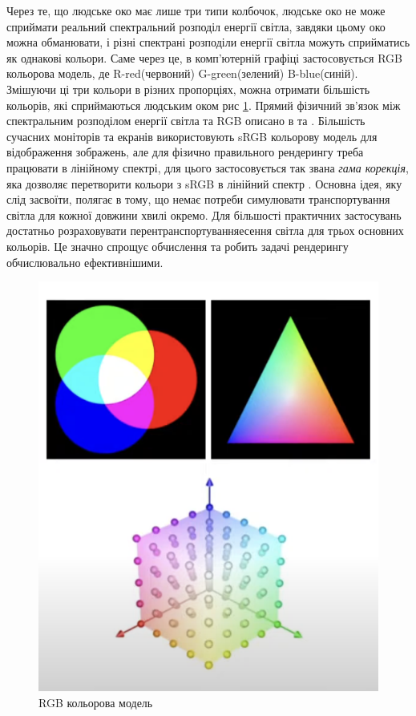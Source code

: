 Через те, що людське око має лише три типи колбочок, людське око не може сприймати реальний спектральний розподіл енергії світла,
завдяки цьому око можна обманювати, і різні спектрані розподіли енергії світла можуть сприйматись як однакові кольори. Саме через це, в комп'ютерній графіці
застосовується RGB кольорова модель, де R-red(червоний) G-green(зелений) B-blue(синій). Змішуючи ці три кольори в різних пропорціях, можна отримати 
більшість кольорів, які сприймаються людським оком рис \ref{fig:RGB}. Прямий фізичний зв'язок між спектральним розподілом енергії світла та RGB описано в \cite{Ch0} та \cite{Ch1}.
Більшість сучасних моніторів та екранів використовують sRGB кольорову модель для відображення зображень, але для фізично правильного рендерингу треба працювати в 
лінійному спектрі, для цього застосовується так звана \textit{гама корекція}, яка дозволяє перетворити кольори з sRGB в лінійний спектр \cite{Ch2}.
Основна ідея, яку слід засвоїти, полягає в тому, що немає потреби симулювати транспортування світла для кожної довжини хвилі окремо. Для більшості практичних застосувань 
достатньо розраховувати перентранспортуванняесення світла для трьох основних кольорів. Це значно спрощує обчислення та робить задачі 
рендерингу обчислювально ефективнішими.

\begin{figure}[h]
  \centering
  \includegraphics[scale=1]{Pictures/RGB.png}
  \caption{RGB кольорова модель}
  \label{fig:RGB}
\end{figure}

